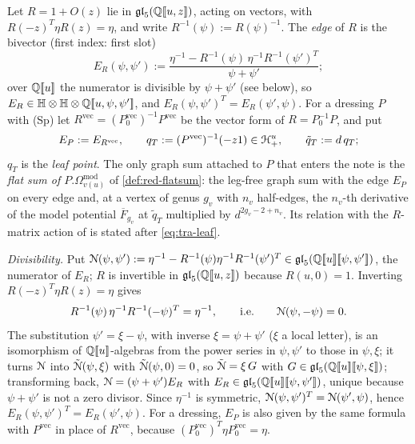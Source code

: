 \begin{defn}
\label{def:tra-edge}
Let $R = 1+O(z)$ lie in $\mathfrak{gl}_5(\mathbb{Q}[\![ u,z ]\!])$, acting on vectors, with $R(-z)^T\eta R(z) = \eta$, and write $R^{-1}(\psi) := R(\psi)^{-1}$. The \emph{edge} of $R$ is the bivector (first index: first slot)
\[
E_R(\psi,\psi') := \frac{\eta^{-1}-R^{-1}(\psi)\,\eta^{-1}R^{-1}(\psi')^T}{\psi+\psi'} ;
\]
over $\mathbb{Q}[\![ u ]\!]$ the numerator is divisible by $\psi+\psi'$ (see below), so $E_R\in\mathbb{H}\otimes\mathbb{H}\otimes\mathbb{Q}[\![ u,\psi,\psi' ]\!]$, and $E_R(\psi,\psi')^T = E_R(\psi',\psi)$. For a dressing $P$ with (Sp) let $R^{\mathrm{vec}} = (P_0^{\mathrm{vec}})^{-1}P^{\mathrm{vec}}$ be the vector form of $R = P_0^{-1}P$, and put
\[
E_P := E_{R^{\mathrm{vec}}},\qquad q_T := (P^{\mathrm{vec}})^{-1}(-z1)\in\mathcal{H}^u_+,\qquad \tilde q_T := d\,q_T ;
\]
$q_T$ is the \emph{leaf point}. The only graph sum attached to $P$ that enters the note is the \emph{flat sum of $P.\Omega^{\mathrm{mod}}_{v(u)}$} of \cref{def:red-flatsum}: the leg-free graph sum with the edge $E_P$ on every edge and, at a vertex of genus $g_v$ with $n_v$ half-edges, the $n_v$-th derivative of the model potential $\overline F_{g_v}$ at $\tilde q_T$ multiplied by $d^{2g_v-2+n_v}$. Its relation with the $R$-matrix action of \cite[Def.~2.2]{PPZ15} is stated after \eqref{eq:tra-leaf}.
\end{defn}

\emph{Divisibility.} Put $\mathcal{N}(\psi,\psi') := \eta^{-1}-R^{-1}(\psi)\eta^{-1}R^{-1}(\psi')^T\in\mathfrak{gl}_5(\mathbb{Q}[\![ u ]\!][\![ \psi,\psi' ]\!])$, the numerator of $E_R$; $R$ is invertible in $\mathfrak{gl}_5(\mathbb{Q}[\![ u,z ]\!])$ because $R(u,0) = 1$. Inverting $R(-z)^T\eta R(z) = \eta$ gives
\[
R^{-1}(\psi)\,\eta^{-1}R^{-1}(-\psi)^T = \eta^{-1},\qquad\text{i.e.}\qquad \mathcal{N}(\psi,-\psi) = 0 .
\] The substitution $\psi' = \xi-\psi$, with inverse $\xi = \psi+\psi'$ ($\xi$ a local letter), is an isomorphism of $\mathbb{Q}[\![ u ]\!]$-algebras from the power series in $\psi,\psi'$ to those in $\psi,\xi$; it turns $\mathcal{N}$ into $\tilde{\mathcal{N}}(\psi,\xi)$ with $\tilde{\mathcal{N}}(\psi,0) = 0$, so $\tilde{\mathcal{N}} = \xi\,G$ with $G\in\mathfrak{gl}_5(\mathbb{Q}[\![ u ]\!][\![ \psi,\xi ]\!])$; transforming back, $\mathcal{N} = (\psi+\psi')E_R$ with $E_R\in\mathfrak{gl}_5(\mathbb{Q}[\![ u ]\!][\![ \psi,\psi' ]\!])$, unique because $\psi+\psi'$ is not a zero divisor. Since $\eta^{-1}$ is symmetric, $\mathcal{N}(\psi,\psi')^T = \mathcal{N}(\psi',\psi)$, hence $E_R(\psi,\psi')^T = E_R(\psi',\psi)$. For a dressing, $E_P$ is also given by the same formula with $P^{\mathrm{vec}}$ in place of $R^{\mathrm{vec}}$, because $(P_0^{\mathrm{vec}})^T\eta P_0^{\mathrm{vec}} = \eta$.

